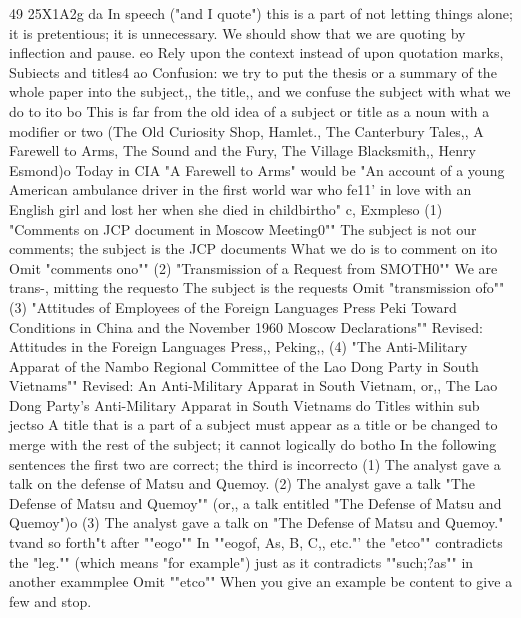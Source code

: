 \documentclass[
    oneside,
    11pt,
    draft
]{memoir}
\begin{document}
49 25X1A2g da In speech ("and I quote") this is a part of not letting things alone; it is pretentious; it is unnecessary. We should show that we are quoting by inflection and pause. eo Rely upon the context instead of upon quotation marks, Subiects and titles4 ao Confusion: we try to put the thesis or a summary of the whole paper into the subject,, the title,, and we confuse the subject with what we do to ito bo This is far from the old idea of a subject or title as a noun with a modifier or two (The Old Curiosity Shop, Hamlet., The Canterbury Tales,, A Farewell to Arms, The Sound and the Fury, The Village Blacksmith,, Henry Esmond)o Today in CIA "A Farewell to Arms" would be "An account of a young American ambulance driver in the first world war who fe11' in love with an English girl and lost her when she died in childbirtho" c, Exmpleso (1) "Comments on JCP document in Moscow Meeting0"" The subject is not our comments; the subject is the JCP documents What we do is to comment on ito Omit "comments ono"" (2) "Transmission of a Request from SMOTH0"" We are trans-, mitting the requesto The subject is the requests Omit "transmission ofo"" (3) "Attitudes of Employees of the Foreign Languages Press Peki Toward Conditions in China and the November 1960 Moscow Declarations"" Revised: Attitudes in the Foreign Languages Press,, Peking,, (4) "The Anti-Military Apparat of the Nambo Regional Committee of the Lao Dong Party in South Vietnams"" Revised: An Anti-Military Apparat in South Vietnam, or,, The Lao Dong Party's Anti-Military Apparat in South Vietnams do Titles within sub jectso A title that is a part of a subject must appear as a title or be changed to merge with the rest of the subject; it cannot logically do botho In the following sentences the first two are correct; the third is incorrecto (1) The analyst gave a talk on the defense of Matsu and Quemoy. (2) The analyst gave a talk "The Defense of Matsu and Quemoy"" (or,, a talk entitled "The Defense of Matsu and Quemoy")o (3) The analyst gave a talk on "The Defense of Matsu and Quemoy." tvand so forth"t after ""eogo"" In ""eogof, As, B, C,, etc."' the "etco"" contradicts the "leg."" (which means "for example") just as it contradicts ""such;?as"" in another exammplee Omit ""etco"" When you give an example be content to give a few and stop.
\end{document}
